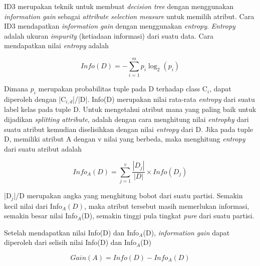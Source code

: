 ID3 merupakan teknik untuk membuat \textsl{decision tree} dengan menggunakan \textsl{information gain} sebagai \textsl{attribute selection measure} untuk memilih atribut. Cara ID3 mendapatkan \textsl{information gain} dengan menggunakan \textsl{entropy}. \textsl{Entropy} adalah ukuran \textsl{impurity} (ketiadaan informasi) dari suatu data. Cara mendapatkan nilai \textsl{entropy} adalah


\begin{displaymath}
	Info(D) = -\sum_{i=1}^{m} p_{i} \log_2(p_{i})
\end{displaymath}

Dimana $p_{i}$ merupakan probabilitas tuple pada D terhadap class C$_{i}$, dapat diperoleh dengan |C$_{i,d}$|/|D|. Info(D) merupakan nilai rata-rata \textsl{entropy} dari suatu label kelas pada tuple D. Untuk mengetahui atribut mana yang paling baik untuk dijadikan \textsl{splitting attribute}, adalah dengan cara menghitung nilai \textsl{entrophy} dari suatu atribut kemudian diselisihkan dengan nilai \textsl{entropy} dari D. Jika pada tuple D, memiliki atribut A dengan v nilai yang berbeda, maka menghitung \textsl{entropy} dari suatu atribut adalah

\begin{displaymath}
	Info_A(D) = \sum_{j=1}^v \frac{|D_j|}{|D|} \times Info(D_j)
\end{displaymath}

|D$_{j}$|/D merupakan angka yang menghitung bobot dari suatu partisi. Semakin kecil nilai dari Info$_{A}(D)$, maka atribut tersebut masih memerlukan informasi, semakin besar nilai Info$_{A}$(D), semakin tinggi pula tingkat \textsl{pure} dari suatu partisi.

Setelah mendapatkan nilai Info(D) dan Info$_{A}$(D), \textsl{information gain} dapat diperoleh dari selisih nilai Info(D) dan Info$_{A}$(D)

\begin{displaymath}
	Gain(A) = Info(D) - Info_A(D)
\end{displaymath}

